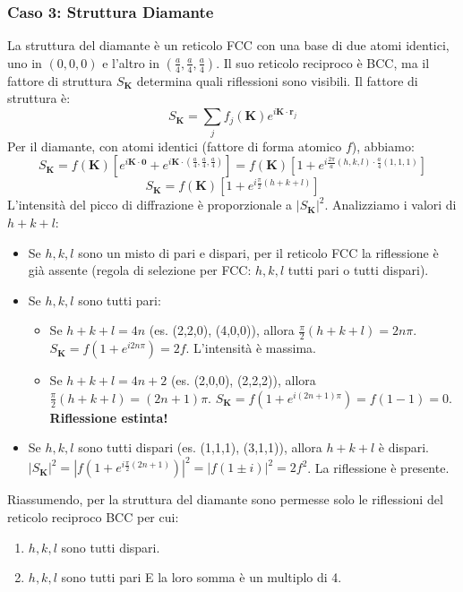 \subsubsection{Caso 3: Struttura Diamante}
La struttura del diamante è un reticolo FCC con una base di due atomi identici, uno in $(0,0,0)$ e l'altro in $(\frac{a}{4}, \frac{a}{4}, \frac{a}{4})$. Il suo reticolo reciproco è BCC, ma il fattore di struttura $S_\mathbf{K}$ determina quali riflessioni sono visibili.
Il fattore di struttura è:
$$ S_\mathbf{K} = \sum_j f_j(\mathbf{K}) e^{i\mathbf{K} \cdot \mathbf{r}_j} $$
Per il diamante, con atomi identici (fattore di forma atomico $f$), abbiamo:
$$ S_\mathbf{K} = f(\mathbf{K}) \left[ e^{i\mathbf{K} \cdot \mathbf{0}} + e^{i\mathbf{K} \cdot (\frac{a}{4}, \frac{a}{4}, \frac{a}{4})} \right] = f(\mathbf{K}) \left[ 1 + e^{i \frac{2\pi}{a}(h,k,l) \cdot \frac{a}{4}(1,1,1)} \right] $$
$$ S_\mathbf{K} = f(\mathbf{K}) \left[ 1 + e^{i\frac{\pi}{2}(h+k+l)} \right] $$
L'intensità del picco di diffrazione è proporzionale a $|S_\mathbf{K}|^2$. Analizziamo i valori di $h+k+l$:
\begin{itemize}
    \item Se $h,k,l$ sono un misto di pari e dispari, per il reticolo FCC la riflessione è già assente (regola di selezione per FCC: $h,k,l$ tutti pari o tutti dispari).
    \item Se $h,k,l$ sono tutti pari:
        \begin{itemize}
            \item Se $h+k+l = 4n$ (es. (2,2,0), (4,0,0)), allora $\frac{\pi}{2}(h+k+l) = 2n\pi$. $S_\mathbf{K} = f(1+e^{i2n\pi}) = 2f$. L'intensità è massima.
            \item Se $h+k+l = 4n+2$ (es. (2,0,0), (2,2,2)), allora $\frac{\pi}{2}(h+k+l) = (2n+1)\pi$. $S_\mathbf{K} = f(1+e^{i(2n+1)\pi}) = f(1-1) = 0$. \textbf{Riflessione estinta!}
        \end{itemize}
    \item Se $h,k,l$ sono tutti dispari (es. (1,1,1), (3,1,1)), allora $h+k+l$ è dispari.
    $|S_\mathbf{K}|^2 = |f(1+e^{i\frac{\pi}{2}(2n+1)})|^2 = |f(1 \pm i)|^2 = 2f^2$. La riflessione è presente.
\end{itemize}
Riassumendo, per la struttura del diamante sono permesse solo le riflessioni del reticolo reciproco BCC per cui:
\begin{enumerate}
    \item $h, k, l$ sono tutti dispari.
    \item $h, k, l$ sono tutti pari E la loro somma è un multiplo di 4.
\end{enumerate}

